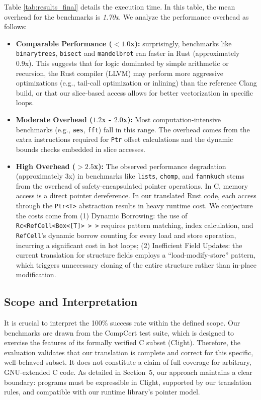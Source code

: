 \documentclass{llncs} %
\begin{document}
Table \ref{tab:results_final} details the execution time. In this table, the mean overhead for the benchmarks is \emph{1.70x}. We analyze the performance overhead as follows:
%
\begin{itemize}
    \item \textbf{Comparable Performance ($<1.0$x):} surprisingly, benchmarks like \texttt{binarytrees}, \texttt{bisect} and \texttt{mandelbrot} ran faster in Rust (approximately 0.9x). This suggests that for logic dominated by simple arithmetic or recursion, the Rust compiler (LLVM) may perform more aggressive optimizations (e.g., tail-call optimization or inlining) than the reference Clang build, or that our slice-based access allows for better vectorization in specific loops.
    
    \item \textbf{Moderate Overhead ($1.2$x - $2.0$x):} Most computation-intensive benchmarks (e.g., \texttt{aes}, \texttt{fft}) fall in this range. The overhead comes from the extra instructions required for \texttt{Ptr} offset calculations and the dynamic bounds checks embedded in slice accesses.
    
    \item \textbf{High Overhead ($>2.5$x):} The observed performance degradation (approximately 3x) in benchmarks like \texttt{lists}, \texttt{chomp}, and \texttt{fannkuch} stems from the overhead of safety-encapsulated pointer operations. In C, memory access is a direct pointer dereference. In our translated Rust code, each access through the \texttt{Ptr<T>} abstraction results in heavy runtime cost. We conjecture the costs come from (1) Dynamic Borrowing: the use of \texttt{Rc<RefCell<Box<[T]> > >} requires pattern matching, index calculation, and \texttt{RefCell}'s dynamic borrow counting for every load and store operation, incurring a significant cost in hot loops; (2) Inefficient Field Updates: the current translation for structure fields employs a ``load-modify-store'' pattern, which triggers unnecessary cloning of the entire structure rather than in-place modification.
\end{itemize}

\subsection{Scope and Interpretation}
It is crucial to interpret the 100\% success rate within the defined scope. Our benchmarks are drawn from the CompCert test suite, which is designed to exercise the features of its formally verified C subset (Clight). Therefore, the evaluation validates that our translation is complete and correct for this specific, well-behaved subset. It does not constitute a claim of full coverage for arbitrary, GNU-extended C code. As detailed in Section~5, our approach maintains a clear boundary: programs must be expressible in Clight, supported by our translation rules, and compatible with our runtime library's pointer model.
\end{document}
